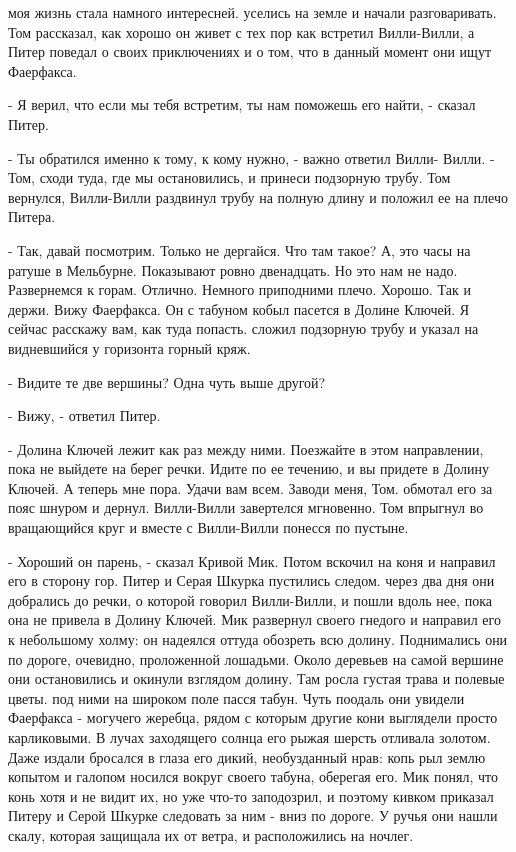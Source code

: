 моя жизнь стала намного интересней.
 уселись на земле и начали разговаривать. Том рассказал, как 
хорошо он живет с тех пор как встретил Вилли-Вилли, а Питер поведал о 
своих приключениях и о том, что в данный момент они ищут Фаерфакса.
\par- Я верил, что если мы тебя встретим, ты нам поможешь его найти, - 
сказал Питер.
\par- Ты обратился именно к тому, к кому нужно, - важно ответил Вилли-
Вилли. - Том, сходи туда, где мы остановились, и принеси подзорную 
трубу.
 Том вернулся, Вилли-Вилли раздвинул трубу на полную длину и 
положил ее на плечо Питера.
\par- Так, давай посмотрим. Только не дергайся. Что там такое? А, это 
часы на ратуше в Мельбурне. Показывают ровно двенадцать. Но это нам не 
надо. Развернемся к горам. Отлично. Немного приподними плечо. Хорошо. 
Так и держи. Вижу Фаерфакса. Он с табуном кобыл пасется в Долине 
Ключей. Я сейчас расскажу вам, как туда попасть.
 сложил подзорную трубу и указал на видневшийся у горизонта 
горный кряж.
\par- Видите те две вершины? Одна чуть выше другой?
\par- Вижу, - ответил Питер.
\par- Долина Ключей лежит как раз между ними. Поезжайте в этом 
направлении, пока не выйдете на берег речки. Идите по ее течению, и вы 
придете в Долину Ключей. А теперь мне пора. Удачи вам всем. Заводи 
меня, Том.
 обмотал его за пояс шнуром и дернул. Вилли-Вилли завертелся 
мгновенно. Том впрыгнул во вращающийся круг и вместе с Вилли-Вилли 
понесся по пустыне.
\par- Хороший он парень, - сказал Кривой Мик. Потом вскочил на коня и 
направил его в сторону гор. Питер и Серая Шкурка пустились следом.
 через два дня они добрались до речки, о которой говорил 
Вилли-Вилли, и пошли вдоль нее, пока она не привела в Долину Ключей.
 Мик развернул своего гнедого и направил его к небольшому 
холму: он надеялся оттуда обозреть всю долину. Поднимались они по 
дороге, очевидно, проложенной лошадьми. Около деревьев на самой 
вершине они остановились и окинули взглядом долину. Там росла густая 
трава и полевые цветы.
 под ними на широком поле пасся табун. Чуть поодаль они 
увидели Фаерфакса - могучего жеребца, рядом с которым другие кони 
выглядели просто карликовыми. В лучах заходящего солнца его рыжая 
шерсть отливала золотом. Даже издали бросался в глаза его дикий, 
необузданный нрав: копь рыл землю копытом и галопом носился вокруг 
своего табуна, оберегая его.
 Мик понял, что конь хотя и не видит их, но уже что-то 
заподозрил, и поэтому кивком приказал Питеру и Серой Шкурке следовать 
за ним - вниз по дороге. У ручья они нашли скалу, которая защищала их 
от ветра, и расположились на ночлег.
